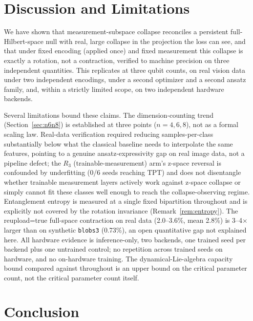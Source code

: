 \documentclass[pdflatex,sn-mathphys-ay]{sn-jnl}
\theoremstyle{thmstyleone}
\theoremstyle{thmstyletwo}
\begin{document}
\section{Discussion and Limitations}
\label{sec:discussion}

We have shown that measurement-subspace collapse reconciles a persistent full-Hilbert-space null with real, large collapse in the projection the loss can see, and that under fixed encoding (applied once) and fixed measurement this collapse is exactly a rotation, not a contraction, verified to machine precision on three independent quantities. This replicates at three qubit counts, on real vision data under two independent encodings, under a second optimizer and a second ansatz family, and, within a strictly limited scope, on two independent hardware backends.

Several limitations bound these claims. The dimension-counting trend (Section~\ref{sec:n6n8}) is established at three points ($n=4,6,8$), not as a formal scaling law. Real-data verification required reducing samples-per-class substantially below what the classical baseline needs to interpolate the same features, pointing to a genuine ansatz-expressivity gap on real image data, not a pipeline defect; the $R_3$ (trainable-measurement) arm's z-space reversal is confounded by underfitting (0/6 seeds reaching TPT) and does not disentangle whether trainable measurement layers actively work against z-space collapse or simply cannot fit these classes well enough to reach the collapse-observing regime. Entanglement entropy is measured at a single fixed bipartition throughout and is explicitly not covered by the rotation invariance (Remark~\ref{rem:entropy}). The reupload=true full-space contraction on real data (2.0--3.6\%, mean 2.8\%) is 3--4$\times$ larger than on synthetic \texttt{blobs3} (0.73\%), an open quantitative gap not explained here. All hardware evidence is inference-only, two backends, one trained seed per backend plus one untrained control; no repetition across trained seeds on hardware, and no on-hardware training. The dynamical-Lie-algebra capacity bound compared against throughout is an upper bound on the critical parameter count, not the critical parameter count itself.

\section{Conclusion}
\label{sec:conclusion}
\end{document}
